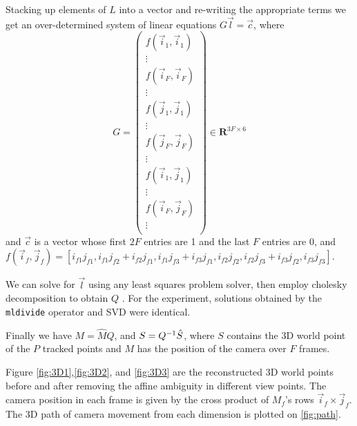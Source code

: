 Stacking up elements of $L$ into a vector and re-writing the appropriate terms
we get an over-determined system of linear equations $G\vec l = \vec
c$, where $$
  G = \begin{pmatrix}
    f(\vec i_1, \vec i_1) \\ \vdots \\f(\vec i_F, \vec i_F) \\ \vdots \\
    f(\vec j_1, \vec j_1) \\ \vdots \\    f(\vec j_F, \vec j_F) \\ \vdots \\
    f(\vec i_1, \vec j_1) \\ \vdots \\f(\vec i_F, \vec j_F) \\ \vdots \\
  \end{pmatrix}\in \mathbf{R}^{3F\times 6}$$
 and $\vec c$ is a vector whose first $2F$ entries are 1 and the last
 $F$ entries are 0, and $f(\vec i_f, \vec j_f) = [i_{f1}j_{f1},
 i_{f1}j_{f2}+i_{f2}j_{f1}, i_{f1}j_{f3}+i_{f3}j_{f1}, i_{f2}j_{f2},
 i_{f2}j_{f3}+i_{f3}j_{f2}, i_{f3}j_{f3}]$.

We can solve for $\vec l$ using any least squares problem solver, then
employ cholesky decomposition to obtain $Q$ \cite{Morita}. For the
experiment, solutions obtained by the \texttt{mldivide} operator and
SVD were identical.

Finally we have $M = \hat MQ$, and $S =Q^{-1} \hat S$, where $S$
contains the 3D world point of the $P$ tracked points and $M$ has the
position of the camera over $F$ frames. 

Figure \ref{fig:3D1},\ref{fig:3D2}, and \ref{fig:3D3} are the
reconstructed 3D world points before and after removing the affine
ambiguity in different view points.
The camera position in each frame is given by the cross product of
$M_f$'s rows $\vec i_f \times \vec j_f$. The 3D path of camera
movement from each dimension is plotted on \ref{fig:path}.

